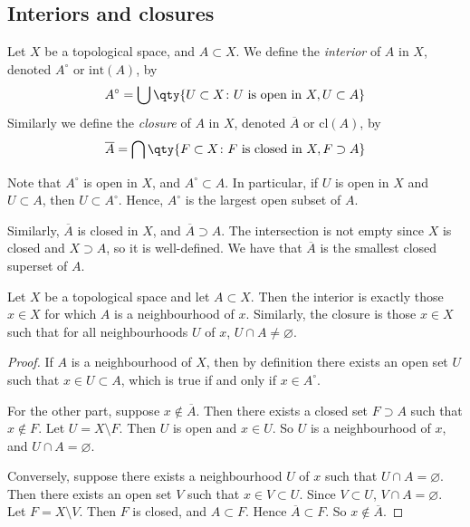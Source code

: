 \subsection{Interiors and closures}
\begin{definition}
	Let \( X \) be a topological space, and \( A \subset X \).
	We define the \textit{interior} of \( A \) in \( X \), denoted \( A^\circ \) or \( \mathrm{int}(A) \), by
	\[
		A^\circ = \bigcup \qty{ U \subset X \colon U \text{ is open in } X, U \subset A }
	\]
	Similarly we define the \textit{closure} of \( A \) in \( X \), denoted \( \overline A \) or \( \mathrm{cl}(A) \), by
	\[
		\overline A = \bigcap \qty{ F \subset X \colon F \text{ is closed in } X, F \supset A }
	\]
\end{definition}
\begin{remark}
	Note that \( A^\circ \) is open in \( X \), and \( A^\circ \subset A \).
	In particular, if \( U \) is open in \( X \) and \( U \subset A \), then \( U \subset A^\circ \).
	Hence, \( A^\circ \) is the largest open subset of \( A \).

	Similarly, \( \overline A \) is closed in \( X \), and \( \overline A \supset A \).
	The intersection is not empty since \( X \) is closed and \( X \supset A \), so it is well-defined.
	We have that \( \overline A \) is the smallest closed superset of \( A \).
\end{remark}
\begin{proposition}
	Let \( X \) be a topological space and let \( A \subset X \).
	Then the interior is exactly those \( x \in X \) for which \( A \) is a neighbourhood of \( x \).
	Similarly, the closure is those \( x \in X \) such that for all neighbourhoods \( U \) of \( x \), \( U \cap A \neq \varnothing \).
\end{proposition}
\begin{proof}
	If \( A \) is a neighbourhood of \( X \), then by definition there exists an open set \( U \) such that \( x \in U \subset A \), which is true if and only if \( x \in A^\circ \).

	For the other part, suppose \( x \not\in \overline A \).
	Then there exists a closed set \( F \supset A \) such that \( x \not\in F \).
	Let \( U = X \setminus F \).
	Then \( U \) is open and \( x \in U \).
	So \( U \) is a neighbourhood of \( x \), and \( U \cap A = \varnothing \).

	Conversely, suppose there exists a neighbourhood \( U \) of \( x \) such that \( U \cap A = \varnothing \).
	Then there exists an open set \( V \) such that \( x \in V \subset U \).
	Since \( V \subset U \), \( V \cap A = \varnothing \).
	Let \( F = X \setminus V \).
	Then \( F \) is closed, and \( A \subset F \).
	Hence \( \overline A \subset F \).
	So \( x \not\in \overline A \).
\end{proof}

